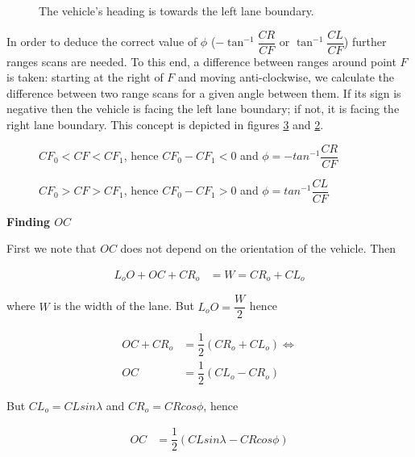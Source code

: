 \begin{figure}[H]\centering
  \scalebox{1}{}
  \caption{The vehicle's heading is towards the left lane boundary.}
  \label{}
\end{figure}

In order to deduce the correct value of $\phi$ ($-\tan^{-1}\dfrac{CR}{CF}$ or
$\tan^{-1}\dfrac{CL}{CF}$) further ranges scans are needed. To this end,
a difference between ranges around point $F$ is taken: starting at the
right of $F$ and moving anti-clockwise, we calculate the difference between
two range scans for a given angle between them. If its sign
is negative then the vehicle is facing the left lane boundary; if not,
it is facing the right lane boundary. This concept is depicted in figures
\ref{fig:range_mpc_diff_positive} and  \ref{fig:range_mpc_diff_negative}.

\begin{figure}[H]\centering
  \scalebox{1}{}
  \caption{$CF_0 < CF < CF_1$, hence $CF_0 - CF_1 < 0$ and $\phi = -tan^{-1} \dfrac{CR}{CF}$}
  \label{fig:range_mpc_diff_negative}
\end{figure}

\begin{figure}[H]\centering
  \scalebox{1}{}
  \caption{$CF_0 > CF > CF_1$, hence $CF_0 - CF_1 > 0$ and $\phi = tan^{-1} \dfrac{CL}{CF}$}
  \label{fig:range_mpc_diff_positive}
\end{figure}


\textbf{Finding $OC$}

First we note that $OC$ does not depend on the orientation of the vehicle. Then

\begin{align}
  L_o O + OC + CR_o &= W = CR_o + CL_o
\end{align}

where $W$ is the width of the lane. But $L_o O = \dfrac{W}{2}$ hence

\begin{align}
  OC + CR_o &= \dfrac{1}{2}(CR_o + CL_o) \Leftrightarrow \\
  OC &= \dfrac{1}{2}(CL_o - CR_o)
\end{align}

But $CL_o = CL sin\lambda$ and $CR_o = CR cos\phi$, hence


\begin{align}
  OC &= \dfrac{1}{2}(CL sin\lambda - CR cos\phi)
\end{align}

